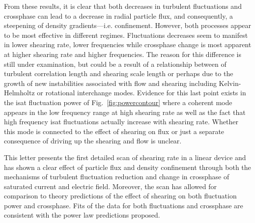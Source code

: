 \documentclass[%
 aip,
 amsmath,amssymb,
 preprint,%
]{revtex4-1}
\begin{document}
From these results, it is clear that both decreases in turbulent fluctuations and crossphase can lead to a decrease in radial particle flux, and consequently, a steepening of density gradients---i.e. confinement. However, both processes appear to be most effective in different regimes. Fluctuations decreases seem to manifest in lower shearing rate, lower frequencies while crossphase change is most apparent at higher shearing rate and higher frequencies. The reason for this difference is still under examination, but could be a result of a relationship between of turbulent correlation length and shearing scale length or perhaps due to the growth of new instabilities associated with flow and shearing including Kelvin-Helmholtz or rotational interchange modes. Evidence for this last point exists in the isat fluctuation power of
Fig.~\ref{fig:powercontour}
 where a coherent mode appears in the low frequency range at high shearing rate as well as the fact that high frequency isat fluctuations actually increase with shearing rate. Whether this mode is connected to the effect of shearing on flux or just a separate consequence of driving up the shearing and flow is unclear.

This letter presents the first detailed scan of shearing rate in a linear device and has shown a clear effect of particle flux and density confinement through both the mechanisms of turbulent fluctuation reduction and change in crossphase of saturated current and electric field. Moreover, the scan has allowed for comparison to theory predictions of the effect of shearing on both fluctuation power and crossphase. Fits of the data for both fluctuations and crossphase are consistent with the power law predictions proposed.

\end{document}
